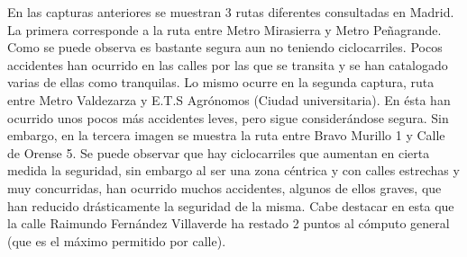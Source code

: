En las capturas anteriores se muestran 3 rutas diferentes consultadas en Madrid.
La primera corresponde a la ruta entre Metro Mirasierra y Metro Peñagrande. Como se puede observa es bastante segura aun no teniendo ciclocarriles. Pocos accidentes han ocurrido en las calles por las que se transita y se han catalogado varias de ellas como tranquilas.
Lo mismo ocurre en la segunda captura, ruta entre Metro Valdezarza y E.T.S Agrónomos (Ciudad universitaria). En ésta han ocurrido unos pocos más accidentes leves, pero sigue considerándose segura.
Sin embargo, en la tercera imagen se muestra la ruta entre Bravo Murillo 1 y Calle de Orense 5. Se puede observar que hay ciclocarriles que aumentan en cierta medida la seguridad, sin embargo al ser una zona céntrica y con calles estrechas y muy concurridas, han ocurrido muchos accidentes, algunos de ellos graves, que han reducido drásticamente la seguridad de la misma. Cabe destacar en esta que la calle Raimundo Fernández Villaverde ha restado 2 puntos al cómputo general (que es el máximo permitido por calle).


